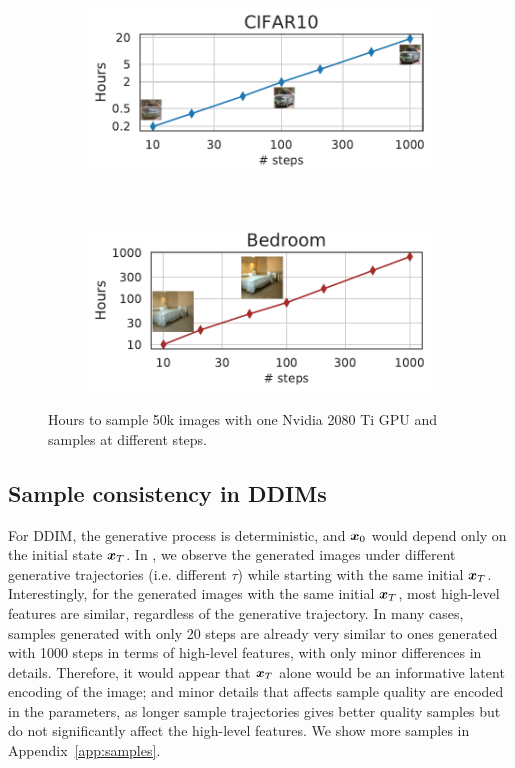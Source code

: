 \begin{figure}
    \centering
    \begin{subfigure}{0.4\textwidth}
    \centering
        \includegraphics[width=\textwidth]{figures/cifar10-tvh.pdf}
    \end{subfigure}
    ~
     \begin{subfigure}{0.4\textwidth}
     \centering
        \includegraphics[width=\textwidth]{figures/bedroom-tvh.pdf}
    \end{subfigure}
    \caption{Hours to sample 50k images with one Nvidia 2080 Ti GPU and samples at different steps.}
    \label{fig:time}
\end{figure}

\subsection{Sample consistency in DDIMs} 
For DDIM, the generative process is deterministic, and ${\bm{x}}_0$ would depend only on the initial state ${\bm{x}}_T$. In , we observe the generated images under different generative trajectories (i.e. different $\tau$) while starting with the same initial ${\bm{x}}_T$. Interestingly, for the generated images with the same initial ${\bm{x}}_T$, most high-level features are similar, regardless of the generative trajectory. In many cases, samples generated with only 20 steps are already very similar to ones generated with 1000 steps in terms of high-level features, with only minor differences in details. 
Therefore, it would appear that ${\bm{x}}_T$ alone would be an informative latent encoding of the image; and minor details that affects sample quality are encoded in the parameters, as longer sample trajectories gives better quality samples but do not significantly affect the high-level features.
We show more samples in Appendix~\ref{app:samples}. %

